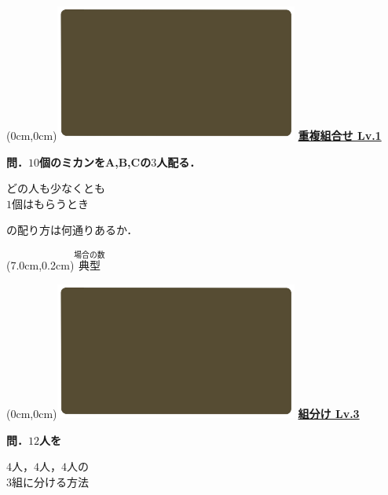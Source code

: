\documentclass[10pt,
fleqn,
dvipdfmx,
uplatex
]{jsarticle}
\begin{document}
\at(0cm,0cm){\includegraphics[width=8cm,bb=0 0 1920 1080]{./youtube/thumbnails/templates/smart_background/場合の数.jpeg}}
{\color{orange}\bf\boldmath\LARGE\underline{重複組合せ Lv.1 }}\vspace{0.3zw}


\normalsize
\bf\boldmath 問．${10}$個のミカンをA,\;B,\;Cの$3$人配る．

\huge
\vspace{-0.1zw}
\hspace{0.1zw} どの人も少なくとも\\
\hfill$1$個はもらうとき\hspace{0.1zw} 

\normalsize
\vspace{0.1zw}
\hfill の配り方は何通りあるか．

\at(7.0cm,0.2cm){\small\color{bradorange}$\overset{\text{場合の数}}{\text{典型}}$}


\newpage



\at(0cm,0cm){\includegraphics[width=8cm,bb=0 0 1920 1080]{./youtube/thumbnails/templates/smart_background/場合の数.jpeg}}
{\color{orange}\bf\boldmath\huge\underline{組分け Lv.3 }}\vspace{0.3zw}

\large 
\bf\boldmath 問．${12}$人を

\Huge
\vspace{-0.3zw}
\hspace{0.1zw} $4$人，$4$人，$4$人の\vspace{-0.2zw}\\
\hfill $3$組に分ける方法\hspace{0.1zw} 
\end{document}
